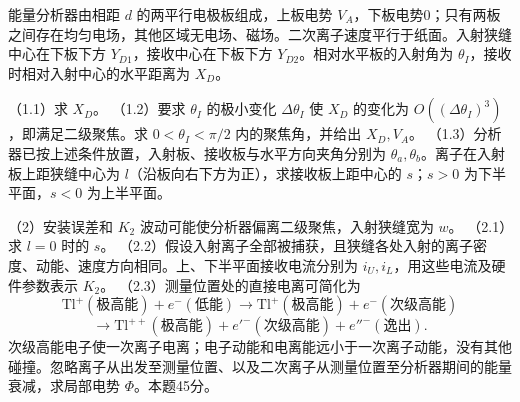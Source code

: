 \documentclass[12pt,a4paper,fontset=fandol]{ctexart}
\begin{document}
能量分析器由相距 \(d\) 的两平行电极板组成，上板电势
\(V_A\)，下板电势0；只有两板之间存在均匀电场，其他区域无电场、磁场。二次离子速度平行于纸面。入射狭缝中心在下板下方
\(Y_{D1}\)，接收中心在下板下方 \(Y_{D2}\)。相对水平板的入射角为
\(\theta_I\)，接收时相对入射中心的水平距离为 \(X_D\)。

（1.1）求 \(X_D\)。 （1.2）要求 \(\theta_I\) 的极小变化
\(\Delta\theta_I\) 使 \(X_D\) 的变化为
\(O((\Delta\theta_I)^3)\)，即满足二级聚焦。求 \(0<\theta_I<\pi/2\)
内的聚焦角，并给出 \(X_D,V_A\)。
（1.3）分析器已按上述条件放置，入射板、接收板与水平方向夹角分别为
\(\theta_a,\theta_b\)。离子在入射板上距狭缝中心为
\(l\)（沿板向右下方为正），求接收板上距中心的 \(s\)；\(s>0\)
为下半平面，\(s<0\) 为上半平面。

（2）安装误差和 \(K_2\) 波动可能使分析器偏离二级聚焦，入射狭缝宽为
\(w\)。 （2.1）求 \(l=0\) 时的 \(s\)。
（2.2）假设入射离子全部被捕获，且狭缝各处入射的离子密度、动能、速度方向相同。上、下半平面接收电流分别为
\(i_U,i_L\)，用这些电流及硬件参数表示 \(K_2\)。
（2.3）测量位置处的直接电离可简化为 \[
\mathrm{Tl}^+(\text{极高能})+e^-(\text{低能})
\longrightarrow \mathrm{Tl}^+(\text{极高能})+e^-(\text{次级高能})
\] \[
\longrightarrow
\mathrm{Tl}^{++}(\text{极高能})+e'^-(\text{次级高能})+e''^-(\text{逸出}).
\]
次级高能电子使一次离子电离；电子动能和电离能远小于一次离子动能，没有其他碰撞。忽略离子从出发至测量位置、以及二次离子从测量位置至分析器期间的能量衰减，求局部电势
\(\Phi\)。本题45分。
\end{document}
